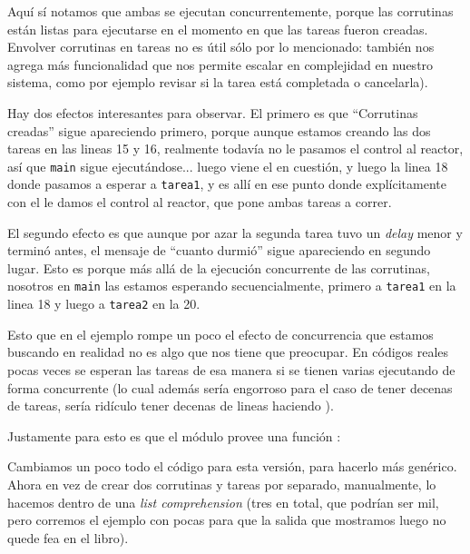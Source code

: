 
Aquí sí notamos que ambas se ejecutan concurrentemente, porque las corrutinas están listas para ejecutarse en el momento en que las tareas fueron creadas. Envolver corrutinas en tareas no es útil sólo por lo mencionado: también nos agrega más funcionalidad que nos permite escalar en complejidad en nuestro sistema, como por ejemplo revisar si la tarea está completada o cancelarla).

Hay dos efectos interesantes para observar. El primero es que ``Corrutinas creadas'' sigue apareciendo primero, porque aunque estamos creando las dos tareas en las lineas 15 y 16, realmente todavía no le pasamos el control al reactor, así que \texttt{main} sigue ejecutándose... luego viene el  en cuestión, y luego la linea 18 donde pasamos a esperar a \texttt{tarea1}, y es allí en ese punto donde explícitamente con el  le damos el control al reactor, que pone ambas tareas a correr.

El segundo efecto es que aunque por azar la segunda tarea tuvo un \textit{delay} menor y terminó antes, el mensaje de ``cuanto durmió'' sigue apareciendo en segundo lugar. Esto es porque más allá de la ejecución concurrente de las corrutinas, nosotros en \texttt{main} las estamos esperando secuencialmente, primero a \texttt{tarea1} en la linea 18 y luego a \texttt{tarea2} en la 20.

Esto que en el ejemplo rompe un poco el efecto de concurrencia que estamos buscando en realidad no es algo que nos tiene que preocupar. En códigos reales pocas veces se esperan las tareas de esa manera si se tienen varias ejecutando de forma concurrente (lo cual además sería engorroso para el caso de tener decenas de tareas, sería ridículo tener decenas de lineas haciendo ).

Justamente para esto es que el módulo  provee una función :


Cambiamos un poco todo el código para esta versión, para hacerlo más genérico. Ahora en vez de crear dos corrutinas y tareas por separado, manualmente, lo hacemos dentro de una \textit{list comprehension} (tres en total, que podrían ser mil, pero corremos el ejemplo con pocas para que la salida que mostramos luego no quede fea en el libro).

